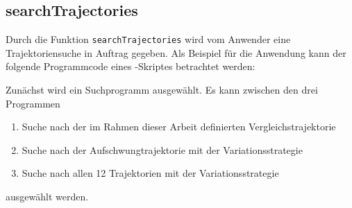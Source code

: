 \subsection{searchTrajectories}\label{subsec:searchtrj}

Durch die Funktion \texttt{searchTrajectories} wird vom Anwender eine Trajektoriensuche in Auftrag gegeben. Als Beispiel für die Anwendung kann der folgende Programmcode eines \Matlab-Skriptes betrachtet werden:



Zunächst wird ein Suchprogramm ausgewählt. Es kann zwischen den drei Programmen

\begin{enumerate}
	\item Suche nach der im Rahmen dieser Arbeit definierten Vergleichstrajektorie
	\item Suche nach der Aufschwungtrajektorie mit der Variationsstrategie
	\item Suche nach allen 12 Trajektorien mit der Variationsstrategie
\end{enumerate}

ausgewählt werden.

